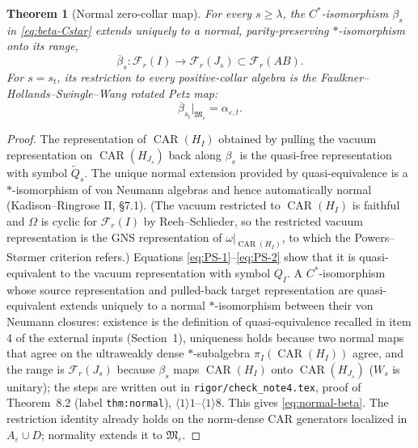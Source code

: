 \documentclass[11pt]{article}
\theoremstyle{accent}
\newtheorem{theorem}{Theorem}[section]
\theoremstyle{definition}
\newcommand{\cF}{\mathcal{F}}
\newcommand{\cM}{\mathfrak{M}}
\newcommand{\CAR}{\operatorname{CAR}}
\newcommand{\eps}{\varepsilon}
\begin{document}
\begin{theorem}[Normal zero-collar map]\label{thm:normal-extension}
For every \(s\ge\lambda\), the \(C^*\)-isomorphism \(\beta_s\) in \eqref{eq:beta-Cstar} extends uniquely to a normal, parity-preserving \(*\)-isomorphism onto its range,
\begin{equation}\label{eq:normal-beta}
 \boxed{
 \overline\beta_s:\cF_r(I)\longrightarrow\cF_r(J_s)
 \subset\cF_r(AB).
 }
\end{equation}
For \(s=s_t\), its restriction to every positive-collar algebra is the Faulkner--Hollands--Swingle--Wang rotated Petz map:
\begin{equation}\label{eq:restriction-normal-beta}
 \overline\beta_{s_t}\big|_{\cM_\eps}=\alpha_{\eps,t}.
\end{equation}
\end{theorem}

\begin{proof}
The representation of \(\CAR(H_I)\) obtained by pulling the vacuum representation on \(\CAR(H_{J_s})\) back along \(\beta_s\) is the quasi-free representation with symbol \(\widetilde Q_s\).  The unique normal extension provided by quasi-equivalence is a \(*\)-isomorphism of von Neumann algebras and hence automatically normal (Kadison--Ringrose II, \S7.1).  (The vacuum restricted to \(\CAR(H_I)\) is faithful and \(\Omega\) is cyclic for \(\cF_r(I)\) by Reeh--Schlieder, so the restricted vacuum representation is the GNS representation of \(\omega|_{\CAR(H_I)}\), to which the Powers--St\o rmer criterion refers.)  Equations \eqref{eq:PS-1}--\eqref{eq:PS-2} show that it is quasi-equivalent to the vacuum representation with symbol \(Q_I\).  A \(C^*\)-isomorphism whose source representation and pulled-back target representation are quasi-equivalent extends uniquely to a normal \(*\)-isomorphism between their von Neumann closures: existence is the definition of quasi-equivalence recalled in item 4 of the external inputs (Section~1), uniqueness holds because two normal maps that agree on the ultraweakly dense \(*\)-subalgebra \(\pi_I(\CAR(H_I))\) agree, and the range is \(\cF_r(J_s)\) because \(\beta_s\) maps \(\CAR(H_I)\) onto \(\CAR(H_{J_s})\) (\(W_s\) is unitary); the steps are written out in \texttt{rigor/check\_note4.tex}, proof of Theorem~8.2 (label \texttt{thm:normal}), \(\langle1\rangle1\)--\(\langle1\rangle8\).  This gives \eqref{eq:normal-beta}.  The restriction identity already holds on the norm-dense CAR generators localized in \(A_\eps\cup D\); normality extends it to \(\cM_\eps\).
\end{proof}
\end{document}
